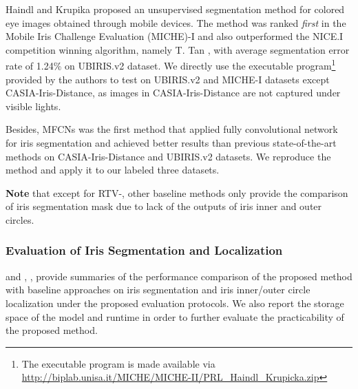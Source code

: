 \documentclass[journal]{IEEEtran}
\begin{document}
Haindl and Krupika\cite{haindl2015unsupervised} proposed an unsupervised segmentation method for colored eye images obtained through mobile devices. The method was ranked \emph{first} in the Mobile Iris Challenge Evaluation (MICHE)-I\cite{de2015mobile} and also outperformed the NICE.I competition winning algorithm, namely T. Tan \etal\cite{tan2010efficient}, with average segmentation error rate  of 1.24\% on UBIRIS.v2 dataset.
We directly use the executable program\footnote{The executable program is made available via \url{http://biplab.unisa.it/MICHE/MICHE-II/PRL_Haindl_Krupicka.zip}} provided by the authors to test on UBIRIS.v2 and MICHE-I datasets except CASIA-Iris-Distance, as images in CASIA-Iris-Distance are not captured under visible lights.

Besides, MFCNs\cite{liu2016accurate} was the first method that applied fully convolutional network for iris segmentation and achieved better results than previous state-of-the-art methods on CASIA-Iris-Distance and UBIRIS.v2 datasets. We reproduce the method and apply it to our labeled three datasets.

\textbf{Note} that except for RTV-, other baseline methods only provide the comparison of iris segmentation mask due to lack of the outputs of iris inner and outer circles.

\subsubsection{Evaluation of Iris Segmentation and Localization}
\label{sec::preprocess_eval}
 and , ,  provide summaries of the performance comparison of the proposed method with baseline approaches on iris segmentation and iris inner/outer circle localization under the proposed evaluation protocols.  We also report the storage space of the model and runtime in order to further evaluate the practicability of the proposed method.
\end{document}
